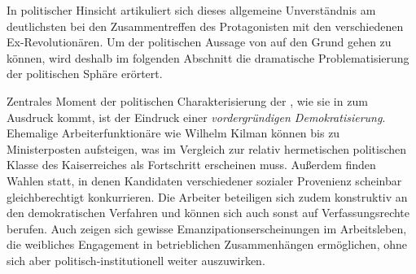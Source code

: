 In politischer Hinsicht artikuliert sich dieses allgemeine Unverständnis am
deutlichsten bei den Zusammentreffen des Protagonisten mit den verschiedenen
Ex-Revolutionären. Um der politischen Aussage von 
auf den Grund gehen zu können, wird deshalb im folgenden Abschnitt die
dramatische Problematisierung der politischen Sphäre erörtert.


Zentrales Moment der politischen Charakterisierung der \Cite{Welt von 1927},
wie sie in  zum Ausdruck kommt, ist der Eindruck
einer \emph{vordergründigen Demokratisierung}. Ehemalige Arbeiterfunktionäre
wie Wilhelm Kilman können bis zu Ministerposten aufsteigen, was im
Vergleich zur relativ hermetischen politischen Klasse des Kaiserreiches als
Fortschritt erscheinen muss. Außerdem finden Wahlen statt, in denen Kandidaten
verschiedener sozialer Provenienz scheinbar gleichberechtigt
konkurrieren.
Die Arbeiter beteiligen sich zudem konstruktiv an den demokratischen Verfahren
und können sich auch sonst auf Verfassungsrechte
berufen.
Auch zeigen sich gewisse Emanzipationserscheinungen im Arbeitsleben, die
weibliches Engagement in betrieblichen Zusammenhängen
ermöglichen, ohne sich aber
politisch-institutionell weiter auszuwirken.

